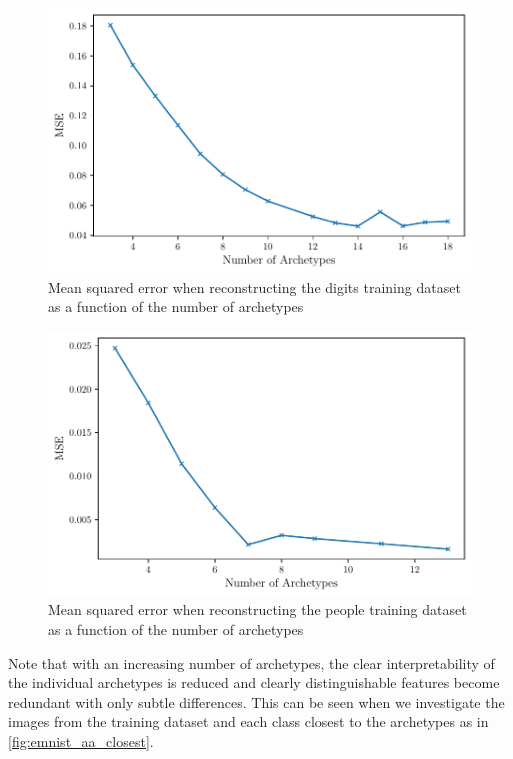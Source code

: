 \begin{figure}[htpb]
	\centering
	\includegraphics{figures/samples/aa_mse_EMNIST.pdf}
	\caption{Mean squared error when reconstructing the digits training
		dataset as a function of the number of archetypes}%
	\label{fig:emnist_aa_mse}
\end{figure}

\begin{figure}[htpb]
	\centering
	\includegraphics{figures/samples/aa_mse_FERG.pdf}
	\caption{Mean squared error when reconstructing the people training
		dataset as a function of the number of archetypes}%
	\label{fig:ferg_aa_mse}
\end{figure}

Note that with an increasing number of archetypes, the
clear interpretability of the individual archetypes is reduced and clearly
distinguishable features become redundant with only subtle differences. This
can be seen when we investigate the images from the training dataset and each
class closest to the archetypes as in \autoref{fig:emnist_aa_closest}.

